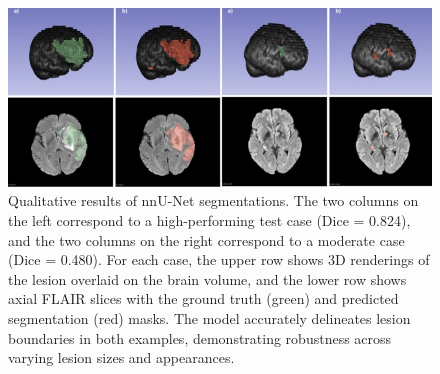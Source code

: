 \documentclass[12pt]{article}
\begin{document}


\begin{figure}[tp]    
    \centering
    \includegraphics[width=\textwidth]{figures/Figure 4.jpg}
    \caption{Qualitative results of nnU-Net segmentations. The two columns on the left correspond to a high-performing test case (Dice = 0.824), and the two columns on the right correspond to a moderate case (Dice = 0.480). For each case, the upper row shows 3D renderings of the lesion overlaid on the brain volume, and the lower row shows axial FLAIR slices with the ground truth (green) and predicted segmentation (red) masks. The model accurately delineates lesion boundaries in both examples, demonstrating robustness across varying lesion sizes and appearances.}\label{fig:nnunet_qualitative}
\end{figure}
\end{document}
